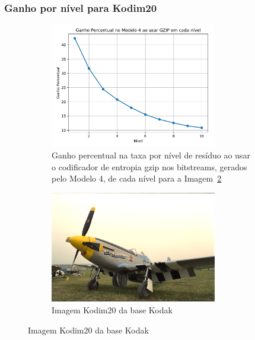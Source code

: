 \documentclass{beamer}
\begin{document}
\begin{frame}
\frametitle{Ganho por nível para Kodim20~\cite{kodak}}
\begin{figure}
\begin{subfigure}{.5\textwidth}
    \centering
    \includegraphics[width=0.8\textwidth]{figs/gain_gzip_kodim20.pdf}
    \caption{Ganho percentual na taxa por nível de resíduo ao usar o codificador de entropia gzip nos bitstreams, gerados pelo Modelo 4, de cada nível para a Imagem~\ref{fig:kodim20}}
\end{subfigure}%
\begin{subfigure}{.5\textwidth}
  \centering
  \includegraphics[width=0.8\textwidth]{figs/kodim20.png}
  \caption{Imagem Kodim20 da base Kodak~\cite{kodak}}
  \label{fig:kodim20}
\end{subfigure}
\end{figure}
\end{frame}
\end{document}
